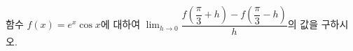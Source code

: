 함수 $f(x)=e^x\cos x$에 대하여 $\displaystyle\lim_{h\to 0}\dfrac{f\!\left(\dfrac{\pi}{3}+h\right)-f\!\left(\dfrac{\pi}{3}-h\right)}{h}$의 값을 구하시오.
